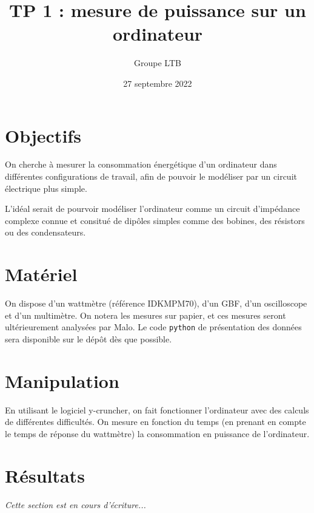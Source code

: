 \documentclass[french]{article}
\title{TP 1 : mesure de puissance sur un ordinateur}
\author{Groupe LTB}
\date{27 septembre 2022}
\begin{document}
\maketitle

\section{Objectifs}

On cherche à mesurer la consommation énergétique d'un ordinateur dans différentes configurations de travail, afin de pouvoir le modéliser par un circuit électrique plus simple.

L'idéal serait de pourvoir modéliser l'ordinateur comme un circuit d'impé\-dance complexe connue et consitué de dipôles simples comme des bobines, des résistors ou des condensateurs.

\section{Matériel}

On dispose d'un wattmètre (référence IDKMPM70), d'un GBF, d'un oscilloscope et d'un multimètre.
On notera les mesures sur papier, et ces mesures seront ultérieurement analysées par Malo. Le code \texttt{python} de présentation des données sera disponible sur le dépôt dès que possible.

\section{Manipulation}

En utilisant le logiciel y-cruncher, on fait fonctionner l'ordinateur avec des calculs de différentes difficultés. On mesure en fonction du temps (en prenant en compte le temps de réponse du wattmètre) la consommation en puissance de l'ordinateur.

\section{Résultats}

\textit{Cette section est en cours d'écriture...}
\end{document}
